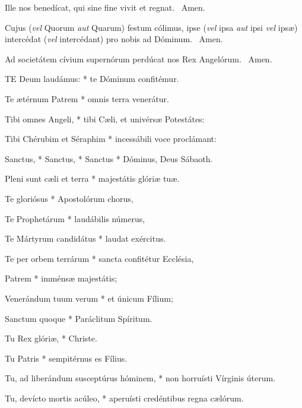 
 Ille nos benedícat, qui sine fine vivit et regnat. \R\ Amen.

 Cujus (\textit{vel} Quorum \textit{aut} Quarum) festum cólimus, ipse (\textit{vel} ipsa \textit{aut} ipsi \textit{vel} ipsæ) intercédat (\textit{vel} intercédant) pro nobis ad Dóminum. \R\ Amen.

 Ad societátem cívium supernórum perdúcat nos Rex Angelórum. \R\ Amen.




\lettrine[lines=2]{T}{E} Deum laudámus: * te Dóminum confitémur.

Te ætérnum Patrem * omnis terra venerátur.

Tibi omnes Angeli, * tibi Cæli, et univérsæ Potestátes:

Tibi Chérubim et Séraphim * incessábili voce proclámant:

Sanctus, * Sanctus, * Sanctus * Dóminus, Deus Sábaoth.

Pleni sunt cæli et terra * majestátis glóriæ tuæ.

Te gloriósus * Apostolórum chorus,

Te Prophetárum * laudábilis númerus,

Te Mártyrum candidátus * laudat exércitus.

Te per orbem terrárum * sancta confitétur Ecclésia,

Patrem * imménsæ majestátis;

Venerándum tuum verum * et únicum Fílium;

Sanctum quoque * Paráclitum Spíritum.

Tu Rex glóriæ, * Christe.

Tu Patris * sempitérnus es Fílius.

Tu, ad liberándum susceptúrus hóminem, * non horruísti Vírginis úterum.

Tu, devícto mortis acúleo, * aperuísti credéntibus regna cælórum.


